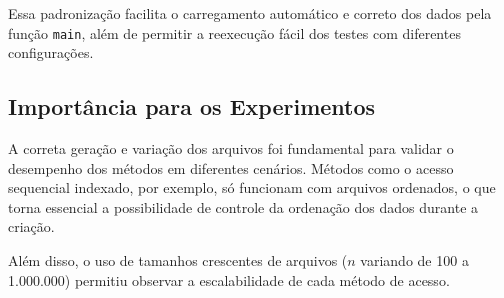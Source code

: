 \documentclass[12pt,a4paper,brazil]{article}
\begin{document}
Essa padronização facilita o carregamento automático e correto dos dados pela função \texttt{main}, além de permitir a reexecução fácil dos testes com diferentes configurações.

\subsection{Importância para os Experimentos}

A correta geração e variação dos arquivos foi fundamental para validar o desempenho dos métodos em diferentes cenários. Métodos como o acesso sequencial indexado, por exemplo, só funcionam com arquivos ordenados, o que torna essencial a possibilidade de controle da ordenação dos dados durante a criação.

Além disso, o uso de tamanhos crescentes de arquivos ($n$ variando de 100 a 1.000.000) permitiu observar a escalabilidade de cada método de acesso.


\printbibliography[title={Referências Bibliográficas}]
\end{document}
